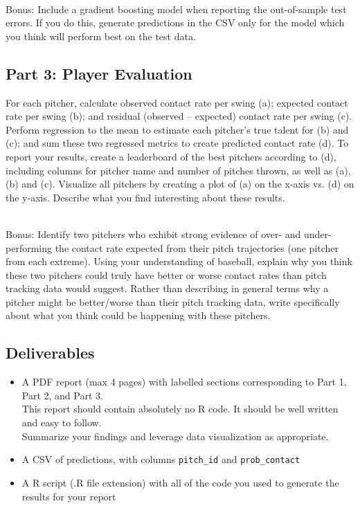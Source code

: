 \documentclass{article}
\begin{document}
      ~\\
      {\sc Bonus:} Include a gradient boosting model when reporting the out-of-sample test errors. If you do this, generate predictions in the CSV only for the model which you think will perform best on the test data.

    \subsection*{\sc Part 3: Player Evaluation}

      For each pitcher, calculate observed contact rate per swing (a); expected contact rate per swing (b); and residual (observed -- expected) contact rate per swing (c). Perform regression to the mean to estimate each pitcher's true talent for (b) and (c); and sum these two regressed metrics to create predicted contact rate (d). To report your results, create a leaderboard of the best pitchers according to (d), including columns for pitcher name and number of pitches thrown, as well as (a), (b) and (c). Visualize all pitchers by creating a plot of (a) on the x-axis vs. (d) on the y-axis. Describe what you find interesting about these results.

      ~\\
      {\sc Bonus:} Identify two pitchers who exhibit strong evidence of over- and under-performing the contact rate expected from their pitch trajectories (one pitcher from each extreme). Using your understanding of baseball, explain why you think these two pitchers could truly have better or worse contact rates than pitch tracking data would suggest. Rather than describing in general terms why a pitcher might be better/worse than their pitch tracking data, write specifically about what you think could be happening with these pitchers.

    \subsection*{\sc Deliverables}

      \begin{itemize}
        \item A PDF report (max 4 pages) with labelled sections corresponding to Part 1, Part 2, and Part 3.\\
        This report should contain absolutely no R code. It should be well written and easy to follow.\\
        Summarize your findings and leverage data visualization as appropriate.
        \item A CSV of predictions, with columns \texttt{pitch\_id} and \texttt{prob\_contact}
        \item A R script (.R file extension) with all of the code you used to generate the results for your report
      \end{itemize}
\end{document}
